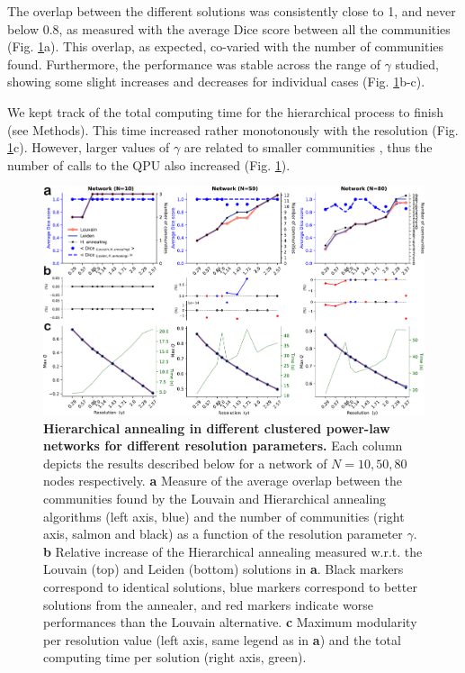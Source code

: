 \documentclass[pdflatex,sn-mathphys-num]{sn-jnl}%
\begin{document}
The overlap between the different solutions was consistently close to 1, and never below 0.8, as measured with the average Dice score between all the communities (Fig. \ref{fig:resolution}a). This overlap, as expected, co-varied with the number of communities found. Furthermore, the performance was stable across the range of $\gamma$ studied, showing some slight increases and decreases for individual cases (Fig. \ref{fig:resolution}b-c). 

We kept track of the total computing time for the hierarchical process to finish (see Methods). This time increased rather monotonously with the resolution (Fig. \ref{fig:resolution}c). However, larger values of $\gamma$ are related to smaller communities \cite{fornito2016fundamentals}, thus the number of calls to the QPU also increased (Fig. \ref{fig:resolution}).

\begin{figure}
    \centering
    \includegraphics[width=1\linewidth]{Figures/Fig4.pdf}
    \caption{\textbf{Hierarchical annealing in different clustered power-law networks for different resolution parameters.} Each column depicts the results described below for a network of $N=10, 50, 80$ nodes respectively. \textbf{a} Measure of the average overlap between the communities found by the Louvain and Hierarchical annealing algorithms (left axis, blue) and the number of communities (right axis, salmon and black) as a function of the resolution parameter $\gamma$. \textbf{b} Relative increase of the Hierarchical annealing measured w.r.t. the Louvain (top) and Leiden (bottom) solutions in \textbf{a}. Black markers correspond to identical solutions, blue markers correspond to better solutions from the annealer, and red markers indicate worse performances than the Louvain alternative. \textbf{c} Maximum modularity per resolution value (left axis, same legend as in \textbf{a}) and the total computing time per solution (right axis, green).}
    \label{fig:resolution}
\end{figure}
\end{document}
